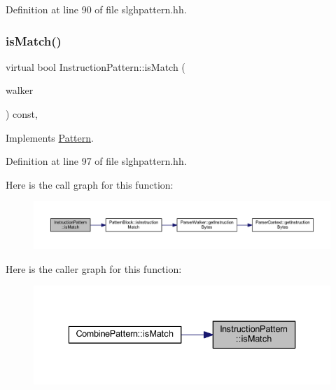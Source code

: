Definition at line 90 of file slghpattern.\+hh.

\mbox{\label{class_instruction_pattern_a879ab052ff7d4082fde3bd53a457a21b}} 
\subsubsection{\texorpdfstring{isMatch()}{isMatch()}}
{\footnotesize\ttfamily virtual bool Instruction\+Pattern\+::is\+Match (\begin{DoxyParamCaption}\item[{\mbox{\hyperlink{class_parser_walker}{Parser\+Walker}} \&}]{walker }\end{DoxyParamCaption}) const\hspace{0.3cm}{\ttfamily [inline]}, {\ttfamily [virtual]}}



Implements \mbox{\hyperlink{class_pattern_a2a85729a1c78a4905bd6ee1d11ea59d5}{Pattern}}.



Definition at line 97 of file slghpattern.\+hh.

Here is the call graph for this function\+:
\nopagebreak
\begin{figure}[H]
\begin{center}
\leavevmode
\includegraphics[width=350pt]{class_instruction_pattern_a879ab052ff7d4082fde3bd53a457a21b_cgraph}
\end{center}
\end{figure}
Here is the caller graph for this function\+:
\nopagebreak
\begin{figure}[H]
\begin{center}
\leavevmode
\includegraphics[width=336pt]{class_instruction_pattern_a879ab052ff7d4082fde3bd53a457a21b_icgraph}
\end{center}
\end{figure}
\mbox{\label{class_instruction_pattern_adeb7cb99c731f21b58f201972d923ac8}} 
